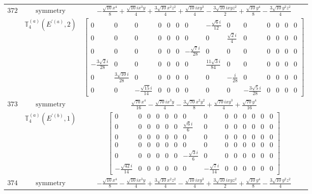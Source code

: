 \documentclass[fleqn,8pt,landscape]{jsarticle}
\begin{document}
\begin{longtable}{ccc}
$ 372 $ & $ \text{symmetry} $ & $ - \frac{\sqrt{10} x^{4}}{8} + \frac{\sqrt{10} i x^{3} y}{4} + \frac{3 \sqrt{10} x^{2} z^{2}}{4} + \frac{\sqrt{10} i x y^{3}}{4} - \frac{3 \sqrt{10} i x y z^{2}}{2} + \frac{\sqrt{10} y^{4}}{8} - \frac{3 \sqrt{10} y^{2} z^{2}}{4} $ \\
$  $ & $ \mathbb{T}_{4}^{(a)}(E^{\prime(a)},2) $ & $ \begin{bmatrix} 0 & 0 & 0 & 0 & 0 & 0 & 0 & - \frac{\sqrt{6} i}{12} & 0 & 0 & 0 & 0 & 0 & 0 \\ 0 & 0 & 0 & 0 & 0 & 0 & 0 & 0 & \frac{\sqrt{2} i}{4} & 0 & 0 & 0 & 0 & 0 \\ 0 & 0 & 0 & 0 & 0 & 0 & - \frac{\sqrt{7} i}{28} & 0 & 0 & 0 & 0 & 0 & 0 & 0 \\ - \frac{3 \sqrt{2} i}{28} & 0 & 0 & 0 & 0 & 0 & 0 & \frac{11 \sqrt{3} i}{84} & 0 & 0 & 0 & 0 & 0 & 0 \\ 0 & \frac{3 \sqrt{10} i}{28} & 0 & 0 & 0 & 0 & 0 & 0 & - \frac{i}{28} & 0 & 0 & 0 & 0 & 0 \\ 0 & 0 & - \frac{\sqrt{15} i}{14} & 0 & 0 & 0 & 0 & 0 & 0 & - \frac{3 \sqrt{5} i}{28} & 0 & 0 & 0 & 0 \end{bmatrix} $ \\ \hline
$ 373 $ & $ \text{symmetry} $ & $ \frac{\sqrt{70} x^{4}}{16} - \frac{\sqrt{70} i x^{3} y}{4} - \frac{3 \sqrt{70} x^{2} y^{2}}{8} + \frac{\sqrt{70} i x y^{3}}{4} + \frac{\sqrt{70} y^{4}}{16} $ \\
$  $ & $ \mathbb{T}_{4}^{(a)}(E^{\prime(b)},1) $ & $ \begin{bmatrix} 0 & 0 & 0 & 0 & 0 & 0 & 0 & 0 & 0 & 0 & 0 & 0 & 0 & 0 \\ 0 & 0 & 0 & 0 & 0 & 0 & \frac{\sqrt{6} i}{6} & 0 & 0 & 0 & 0 & 0 & 0 & 0 \\ 0 & 0 & 0 & 0 & 0 & 0 & 0 & 0 & 0 & 0 & 0 & 0 & 0 & 0 \\ 0 & 0 & 0 & 0 & 0 & 0 & 0 & 0 & 0 & 0 & 0 & 0 & 0 & 0 \\ 0 & 0 & 0 & 0 & 0 & 0 & - \frac{\sqrt{3} i}{6} & 0 & 0 & 0 & 0 & 0 & 0 & 0 \\ - \frac{\sqrt{42} i}{14} & 0 & 0 & 0 & 0 & 0 & 0 & - \frac{\sqrt{7} i}{14} & 0 & 0 & 0 & 0 & 0 & 0 \end{bmatrix} $ \\ \hline
$ 374 $ & $ \text{symmetry} $ & $ - \frac{\sqrt{10} x^{4}}{8} - \frac{\sqrt{10} i x^{3} y}{4} + \frac{3 \sqrt{10} x^{2} z^{2}}{4} - \frac{\sqrt{10} i x y^{3}}{4} + \frac{3 \sqrt{10} i x y z^{2}}{2} + \frac{\sqrt{10} y^{4}}{8} - \frac{3 \sqrt{10} y^{2} z^{2}}{4} $ \\

\end{longtable}
\end{document}
